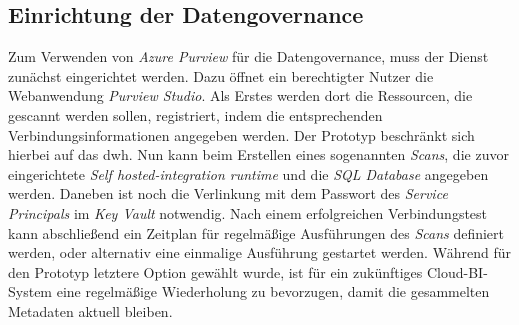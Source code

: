\subsection{Einrichtung der Datengovernance} \label{sec:praktischeUmsetzung:purviewDatengovernance}
Zum Verwenden von \textit{Azure Purview} für die Datengovernance, muss der Dienst zunächst eingerichtet werden. Dazu öffnet ein berechtigter Nutzer die Webanwendung \textit{Purview Studio}. Als Erstes werden dort die Ressourcen, die gescannt werden sollen, registriert, indem die entsprechenden Verbindungsinformationen angegeben werden. Der Prototyp beschränkt sich hierbei auf das \ac{dwh}. Nun kann beim Erstellen eines sogenannten \textit{Scans}, die zuvor eingerichtete \textit{Self hosted-integration runtime} und die \textit{SQL Database} angegeben werden. Daneben ist noch die Verlinkung mit dem Passwort des \textit{Service Principals} im \textit{Key Vault} notwendig. Nach einem erfolgreichen Verbindungstest kann abschließend ein Zeitplan für regelmäßige Ausführungen des \textit{Scans} definiert werden, oder alternativ eine einmalige Ausführung gestartet werden. Während für den Prototyp letztere Option gewählt wurde, ist für ein zukünftiges Cloud-BI-System eine regelmäßige Wiederholung zu bevorzugen, damit die gesammelten Metadaten aktuell bleiben. 

